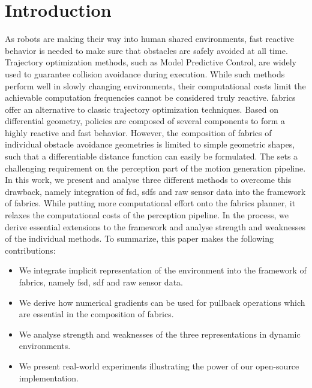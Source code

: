 \section{Introduction}
\label{sec:intro}

As robots are making their way into human shared environments,
fast reactive behavior is needed to make sure that obstacles are safely avoided
at all time. Trajectory optimization methods, such as Model Predictive Control,
are widely used to guarantee collision avoidance during execution. While such
methods perform well in slowly changing environments, their computational costs
limit the achievable computation frequencies cannot be considered truly reactive. 
\ac{fabrics} offer an
alternative to classic trajectory optimization techniques. Based on differential
geometry, policies are composed of several components to form a highly reactive
and fast behavior. However, the composition of \ac{fabrics} of
individual obstacle avoidance geometries is limited to simple geometric shapes,
such that a differentiable distance function can easily be formulated. The 
sets a challenging requirement on the perception part of the motion generation
pipeline. In this work, we present and analyse three different methods to 
overcome this drawback, namely integration of \ac{fsd}, 
\acp{sdf} and raw sensor data into the framework of
\ac{fabrics}. While putting more computational effort onto the fabrics planner, it
relaxes the computational costs of the perception pipeline.
In the process, we derive essential extensions to the framework and
analyse strength and weaknesses of the individual methods. To summarize, this
paper makes the following contributions:
\begin{itemize}
  \item We integrate implicit representation of the environment into the
    framework of \ac{fabrics}, namely \ac{fsd}, \ac{sdf}
    and raw sensor data.
  \item We derive how numerical gradients can be used for pullback operations
    which are essential in the composition of \ac{fabrics}.
  \item We analyse strength and weaknesses of the three representations in
    dynamic environments.
  \item We present real-world experiments illustrating the power of our
    open-source implementation.
\end{itemize}

